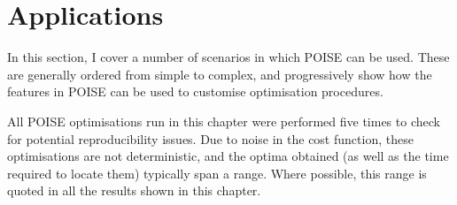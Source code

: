 \section{Applications}
\label{sec:poise__applications}

In this section, I cover a number of scenarios in which POISE can be used.
These are generally ordered from simple to complex, and progressively show how the features in POISE can be used to customise optimisation procedures.

All POISE optimisations run in this chapter were performed five times to check for potential reproducibility issues.
Due to noise in the cost function, these optimisations are not deterministic, and the optima obtained (as well as the time required to locate them) typically span a range.
Where possible, this range is quoted in all the results shown in this chapter.












